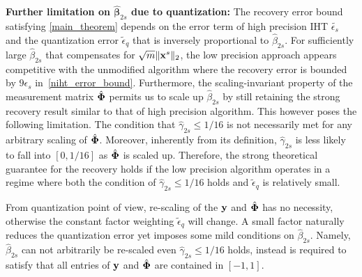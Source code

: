 \documentclass{article}
\begin{document}
{\bf Further limitation on $\hat{\boldsymbol{\beta}}_{2s}$ due to quantization:} The recovery error bound satisfying \ref{main_theorem} depends on the error term of high precision IHT $\tilde{\epsilon_s}$ and the quantization error $\tilde{\epsilon}_q$ that is inversely proportional to $\hat{\beta}_{2s}$. For sufficiently large $\hat{\beta}_{2s}$ that compensates for $\sqrt{m} \|{\bf x}^s \|_2$, the low precision approach appears competitive with the unmodified algorithm where the recovery error is bounded by $9\epsilon_s$ in~\ref{niht_error_bound}. Furthermore, the scaling-invariant property of the measurement matrix $\hat{\bf \Phi}$ permits us to scale up $\hat{\beta}_{2s}$ by still retaining the strong recovery result similar to that of high precision algorithm. This however poses the following limitation. The condition that $\hat{\gamma}_{2s}\leq 1/16$ is not necessarily met for any arbitrary scaling of $\hat{\bf \Phi}$. Moreover, inherently from its definition, $\hat{\gamma}_{2s}$ is less likely to fall into $[0, 1/16]$ as $\hat{\bf \Phi}$ is scaled up. Therefore, the strong theoretical guarantee for the recovery holds if the low precision algorithm operates in a regime where both the condition of $\hat{\gamma}_{2s}\leq 1/16$ holds and $\tilde{\epsilon}_q$ is relatively small.

From quantization point of view, re-scaling of the ${\bf y}$ and $\hat{\bf \Phi}$ has no necessity,
otherwise the constant factor weighting $\tilde{\epsilon}_q$ will change. A small factor naturally reduces the quantization error yet imposes some mild conditions on $\hat{\beta}_{2s}$. Namely, $\hat{\beta}_{2s}$ can not arbitrarily be re-scaled even $\hat{\gamma}_{2s}\leq 1/16$ holds, instead is required to satisfy that all entries of ${\bf y}$ and $\hat{\bf \Phi}$ are contained in $[-1, 1]$.
\end{document}
